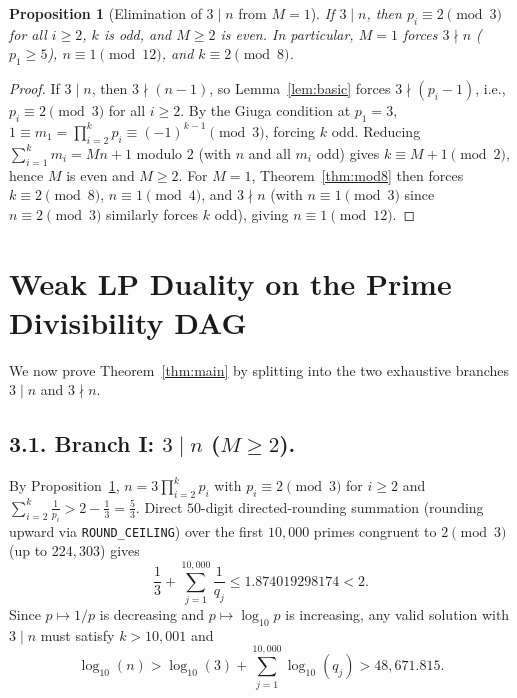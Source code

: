 \documentclass[11pt]{amsart}
\newtheorem{proposition}[theorem]{Proposition}
\theoremstyle{definition}
\theoremstyle{remark}
\numberwithin{equation}{section}
\begin{document}
\begin{proposition}[Elimination of $3 \mid n$ from $M = 1$]\label{prop:three}
If $3 \mid n$, then $p_i \equiv 2 \pmod 3$ for all $i \ge 2$, $k$ is odd, and $M \ge 2$ is even. In particular, $M = 1$ forces $3 \nmid n$ ($p_1 \ge 5$), $n \equiv 1 \pmod{12}$, and $k \equiv 2 \pmod 8$.
\end{proposition}

\begin{proof}
If $3 \mid n$, then $3 \nmid (n - 1)$, so Lemma~\ref{lem:basic} forces $3 \nmid (p_i - 1)$, i.e., $p_i \equiv 2 \pmod 3$ for all $i \ge 2$. By the Giuga condition at $p_1 = 3$, $1 \equiv m_1 = \prod_{i=2}^k p_i \equiv (-1)^{k-1} \pmod 3$, forcing $k$ odd. Reducing $\sum_{i=1}^k m_i = Mn + 1$ modulo $2$ (with $n$ and all $m_i$ odd) gives $k \equiv M + 1 \pmod 2$, hence $M$ is even and $M \ge 2$. For $M = 1$, Theorem~\ref{thm:mod8} then forces $k \equiv 2 \pmod 8$, $n \equiv 1 \pmod 4$, and $3 \nmid n$ (with $n \equiv 1 \pmod 3$ since $n \equiv 2 \pmod 3$ similarly forces $k$ odd), giving $n \equiv 1 \pmod{12}$.
\end{proof}

\section{Weak LP Duality on the Prime Divisibility DAG}

We now prove Theorem~\ref{thm:main} by splitting into the two exhaustive branches $3 \mid n$ and $3 \nmid n$.

\subsection*{3.1. Branch I: $3 \mid n$ ($M \ge 2$).}
By Proposition~\ref{prop:three}, $n = 3 \prod_{i=2}^k p_i$ with $p_i \equiv 2 \pmod 3$ for $i \ge 2$ and $\sum_{i=2}^k \frac{1}{p_i} > 2 - \frac{1}{3} = \frac{5}{3}$. Direct $50$-digit directed-rounding summation (rounding upward via \texttt{ROUND\_CEILING}) over the first $10{,}000$ primes congruent to $2 \pmod 3$ (up to $224{,}303$) gives
\[
    \frac{1}{3} + \sum_{j=1}^{10{,}000} \frac{1}{q_j} \le 1.874019298174 < 2.
\]
Since $p \mapsto 1/p$ is decreasing and $p \mapsto \log_{10} p$ is increasing, any valid solution with $3 \mid n$ must satisfy $k > 10{,}001$ and
\[
    \log_{10}(n) > \log_{10}(3) + \sum_{j=1}^{10{,}000} \log_{10}(q_j) > 48{,}671.815.
\]
\end{document}
